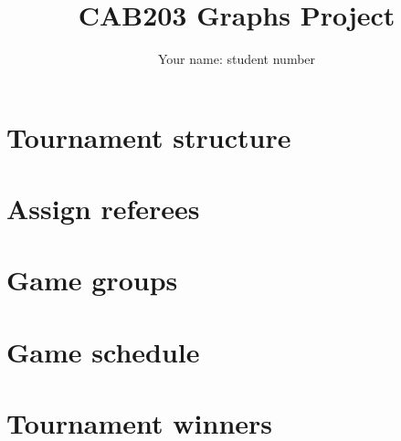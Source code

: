 \documentclass[a4paper]{article}
\author{Your name: student number}
\title{CAB203 Graphs Project}
\begin{document}
\maketitle

\section{Tournament structure}

\section{Assign referees}

\section{Game groups}

\section{Game schedule}

\section{Tournament winners}

\begin{thebibliography}{9}

\end{thebibliography}
\end{document}
